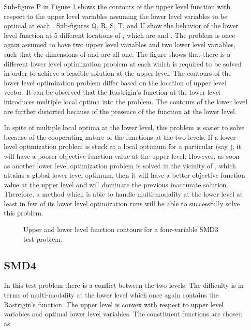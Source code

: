 \documentclass[twoside]{article}
\begin{document}
Sub-figure P in Figure \ref{fig:smd3} shows the contours of the upper level function with respect to the upper level variables assuming the lower level variables to be optimal at each . Sub-figures Q, R, S, T, and U show the behavior of the lower level function at 5 different locations of , which are  and . The problem is once again assumed to have two upper level variables and two lower level variables, such that the dimensions of  and  are all one. The figure shows that there is a different lower level optimization problem at each  which is required to be solved in order to achieve a feasible solution at the upper level. The contours of the lower level optimization problem differ based on the location of upper level vector. It can be observed that the Rastrigin's function at the lower level introduces multiple local optima into the problem. The contours of the lower level are further distorted because of the presence of the  function at the lower level.

In spite of multiple local optima at the lower level, this problem is easier to solve because of the cooperating nature of the functions at the two levels. If a lower level optimization problem is stuck at a local optimum for a particular  (say ), it will have a poorer objective function value at the upper level. However, as soon as another lower level optimization problem is solved in the vicinity of , which attains a global lower level optimum, then it will have a better objective function value at the upper level and will dominate the previous inaccurate solution. Therefore, a method which is able to handle multi-modality at the lower level at least in few of its lower level optimization runs will be able to successfully solve this problem.

\begin{figure}
\begin{center}
\caption{Upper and lower level function contours for a four-variable SMD3 test problem.}
\label{fig:smd3}
\end{center}
\end{figure}

\subsection{SMD4}
In this test problem there is a conflict between the two levels. The difficulty is in terms of multi-modality at the lower level which once again contains the Rastrigin's function. The upper level is convex with respect to upper level variables and optimal lower level variables. The constituent functions are chosen as
\end{document}
